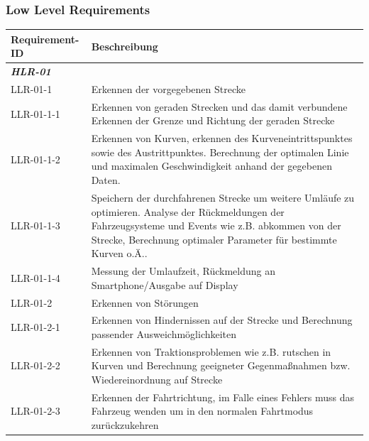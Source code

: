 \documentclass[a4paper,12pt]{article}                                         %
\numberwithin{table}{section}                               %
\numberwithin{figure}{section}                              %
\begin{document}
	
	\subsubsection{Low Level Requirements}
	
	\begin{tabular}{ l | p{} }
	\textbf{Requirement-ID} & \textbf{Beschreibung} \\ \hline
	\textbf{\textit{HLR-01}} & \\
	LLR-01-1 &
	Erkennen der vorgegebenen Strecke\\
	LLR-01-1-1 &
	Erkennen von geraden Strecken und das damit verbundene Erkennen der Grenze und Richtung der geraden Strecke\\
	LLR-01-1-2 &
	Erkennen von Kurven, erkennen des Kurveneintrittspunktes sowie des Austrittpunktes. Berechnung der optimalen Linie und maximalen Geschwindigkeit anhand der gegebenen Daten.\\
	LLR-01-1-3 &
	Speichern der durchfahrenen Strecke um weitere Umläufe zu optimieren. Analyse der Rückmeldungen der Fahrzeugsysteme und Events wie z.B. abkommen von der Strecke, Berechnung optimaler Parameter für bestimmte Kurven o.Ä..  \\
	LLR-01-1-4 &
	Messung der Umlaufzeit, Rückmeldung an Smartphone/Ausgabe auf Display\\
	LLR-01-2 &
	Erkennen von Störungen\\
	LLR-01-2-1 &
	Erkennen von Hindernissen auf der Strecke und Berechnung passender Ausweichmöglichkeiten\\
	LLR-01-2-2 &
	Erkennen von Traktionsproblemen wie z.B. rutschen in Kurven und Berechnung geeigneter Gegenmaßnahmen bzw. Wiedereinordnung auf Strecke\\
	LLR-01-2-3 &
	Erkennen der Fahrtrichtung, im Falle eines Fehlers muss das Fahrzeug wenden um in den normalen Fahrtmodus zurückzukehren \\ \hline
	\end{tabular}
	
\end{document}
